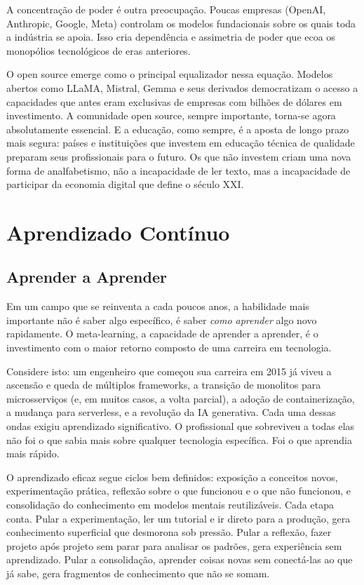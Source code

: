 A concentração de poder é outra preocupação. Poucas empresas (OpenAI, Anthropic, Google, Meta) controlam os modelos fundacionais sobre os quais toda a indústria se apoia. Isso cria dependência e assimetria de poder que ecoa os monopólios tecnológicos de eras anteriores.

O open source emerge como o principal equalizador nessa equação. Modelos abertos como LLaMA, Mistral, Gemma e seus derivados democratizam o acesso a capacidades que antes eram exclusivas de empresas com bilhões de dólares em investimento. A comunidade open source, sempre importante, torna-se agora absolutamente essencial. E a educação, como sempre, é a aposta de longo prazo mais segura: países e instituições que investem em educação técnica de qualidade preparam seus profissionais para o futuro. Os que não investem criam uma nova forma de analfabetismo, não a incapacidade de ler texto, mas a incapacidade de participar da economia digital que define o século XXI.

\section{Aprendizado Contínuo}

\subsection{Aprender a Aprender}

Em um campo que se reinventa a cada poucos anos, a habilidade mais
importante não é saber algo específico, é saber \textit{como aprender}
algo novo rapidamente. O meta-learning, a capacidade de aprender a
aprender, é o investimento com o maior retorno composto de uma carreira
em tecnologia.

Considere isto: um engenheiro que começou sua carreira em 2015 já
viveu a ascensão e queda de múltiplos frameworks, a transição de
monolitos para microsserviços (e, em muitos casos, a volta parcial), a
adoção de containerização, a mudança para serverless, e a revolução da
IA generativa. Cada uma dessas ondas exigiu aprendizado significativo.
O profissional que sobreviveu a todas elas não foi o que sabia mais
sobre qualquer tecnologia específica. Foi o que aprendia mais rápido.

O aprendizado eficaz segue ciclos bem definidos: exposição a conceitos
novos, experimentação prática, reflexão sobre o que funcionou e o que
não funcionou, e consolidação do conhecimento em modelos mentais
reutilizáveis. Cada etapa conta. Pular a experimentação,
ler um tutorial e ir direto para a produção, gera conhecimento
superficial que desmorona sob pressão. Pular a reflexão, fazer
projeto após projeto sem parar para analisar os padrões, gera
experiência sem aprendizado. Pular a consolidação, aprender coisas
novas sem conectá-las ao que já sabe, gera fragmentos de
conhecimento que não se somam.

